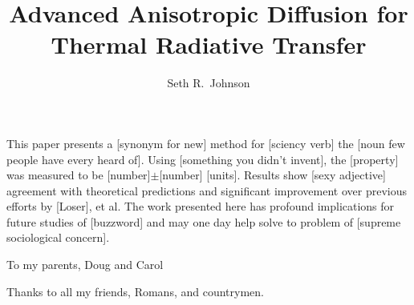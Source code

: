 \documentclass[12pt, letterpaper]{umthesis}
\author{Seth R.~Johnson}
\title{Advanced Anisotropic Diffusion for Thermal Radiative Transfer}
\begin{document}
\frontmatter

\maketitle

\begin{finalabstract}
  This paper presents a [synonym for new] method for [sciency verb] the [noun
  few people have every heard of]. Using [something you didn't invent],
  the [property] was measured to be [number]$\pm$[number] [units].
  Results show [sexy adjective] agreement with theoretical predictions and
  significant improvement over previous efforts by [Loser], et al. The work
  presented here has profound implications for future studies of [buzzword] and
  may one day help solve to problem of [supreme sociological concern].
\end{finalabstract}
\makecopyright


\begin{dedication}
  To my parents, Doug and Carol
\end{dedication}

\begin{acknowledgments}
  Thanks to all my friends, Romans, and countrymen.
\end{acknowledgments}


\tableofcontents
\listoftables
\listoffigures


\mainmatter










\appendix


\backmatter


\end{document}
